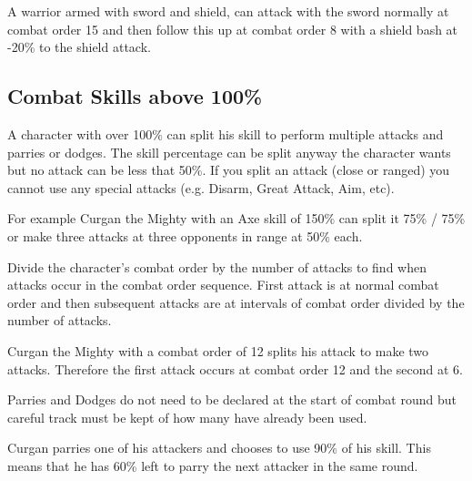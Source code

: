 \begin{rpg-examplebox}
	A warrior armed with sword and shield, can attack with the sword normally at combat order 15 and then follow this up at combat order 8 with a shield bash at -20\% to the shield attack.
\end{rpg-examplebox}

\subsection{Combat Skills above 100\%}
A character with over 100\% can split his skill to perform multiple attacks and parries or dodges. The skill percentage can be split anyway the character wants but no attack can be less that 50\%. If you split an attack (close or ranged) you cannot use any special attacks (e.g. Disarm, Great Attack, Aim, etc).

\begin{rpg-examplebox}
For example Curgan the Mighty with an Axe skill of 150\% can split it 75\% / 75\% or make three attacks at three opponents in range at 50\% each.
\end{rpg-examplebox}

Divide the character’s combat order by the number of attacks to find when attacks occur in the combat order sequence. First attack is at normal combat order and then subsequent attacks are at intervals of combat order divided by the number of attacks.

\begin{rpg-examplebox}
Curgan the Mighty with a combat order of 12 splits his attack to make two attacks. Therefore the first attack occurs at combat order 12 and the second at 6.
\end{rpg-examplebox}

Parries and Dodges do not need to be declared at the start of combat round but careful track must be kept of how many have already been used.

\begin{rpg-examplebox}
Curgan parries one of his attackers and chooses to use 90\% of his skill. This means that he has 60\% left to parry the next attacker in the same round.
\end{rpg-examplebox}

